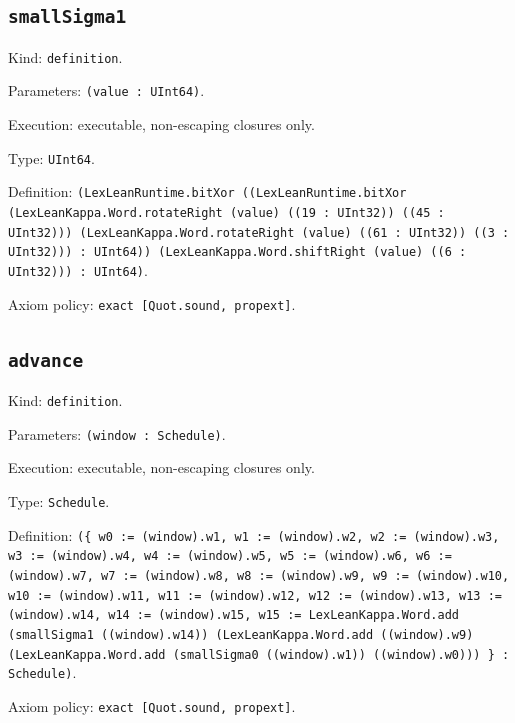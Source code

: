 \documentclass[11pt]{article}
\begin{document}
\subsection*{\texttt{smallSigma1}}
\noindent Kind: \texttt{definition}.\par
\noindent Parameters: \texttt{(value : UInt64)}.\par
\noindent Execution: executable, non-escaping closures only.\par
\noindent Type: \texttt{UInt64}.\par
\noindent Definition: \texttt{(LexLeanRuntime.bitXor ((LexLeanRuntime.bitXor (LexLeanKappa.Word.rotateRight (value) ((19 : UInt32)) ((45 : UInt32))) (LexLeanKappa.Word.rotateRight (value) ((61 : UInt32)) ((3 : UInt32))) : UInt64)) (LexLeanKappa.Word.shiftRight (value) ((6 : UInt32))) : UInt64)}.\par
\noindent Axiom policy: \texttt{exact [Quot.sound, propext]}.\par
\subsection*{\texttt{advance}}
\noindent Kind: \texttt{definition}.\par
\noindent Parameters: \texttt{(window : Schedule)}.\par
\noindent Execution: executable, non-escaping closures only.\par
\noindent Type: \texttt{Schedule}.\par
\noindent Definition: \texttt{(\{ w0 := (window).w1, w1 := (window).w2, w2 := (window).w3, w3 := (window).w4, w4 := (window).w5, w5 := (window).w6, w6 := (window).w7, w7 := (window).w8, w8 := (window).w9, w9 := (window).w10, w10 := (window).w11, w11 := (window).w12, w12 := (window).w13, w13 := (window).w14, w14 := (window).w15, w15 := LexLeanKappa.Word.add (smallSigma1 ((window).w14)) (LexLeanKappa.Word.add ((window).w9) (LexLeanKappa.Word.add (smallSigma0 ((window).w1)) ((window).w0))) \} : Schedule)}.\par
\noindent Axiom policy: \texttt{exact [Quot.sound, propext]}.\par
\end{document}
